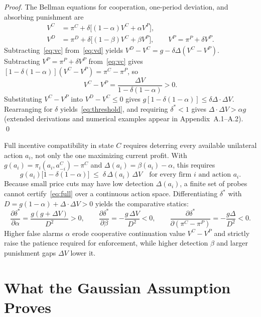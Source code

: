 \documentclass{article}
\begin{document}
\begin{proof}
The Bellman equations for cooperation, one-period deviation, and absorbing punishment are
\begin{align}
V^C &= \pi^C + \delta\bigl[(1-\alpha)V^C + \alpha V^P\bigr],
\label{eq:vc}\\
V^D &= \pi^D + \delta\bigl[(1-\beta)V^C + \beta V^P\bigr], \qquad
V^P = \pi^P + \delta V^P.
\label{eq:vd}
\end{align}
Subtracting~\eqref{eq:vc} from~\eqref{eq:vd} yields $V^D - V^C = g - \delta\Delta(V^C-V^P)$. Subtracting $V^P=\pi^P+\delta V^P$ from~\eqref{eq:vc} gives $[1-\delta(1-\alpha)](V^C-V^P)=\pi^C-\pi^P$, so
\[
V^C - V^P = \frac{\Delta V}{1-\delta(1-\alpha)} > 0.
\]
Substituting $V^C-V^P$ into $V^D-V^C\leq 0$ gives $g[1-\delta(1-\alpha)] \leq \delta\Delta\cdot\Delta V$. Rearranging for $\delta$ yields~\eqref{eq:threshold}, and requiring $\delta^*<1$ gives $\Delta\cdot\Delta V > \alpha g$ (extended derivations and numerical examples appear in Appendix~A.1--A.2). \qed
\end{proof}

Full incentive compatibility in state $C$ requires deterring every available unilateral action $a_i$, not only the one maximizing current profit. With $g(a_i)=\pi_i(a_i,a_{-i}^C)-\pi^C$ and $\Delta(a_i)=\beta(a_i)-\alpha$, this requires
\begin{equation}\label{eq:full}
g(a_i)\bigl[1-\delta(1-\alpha)\bigr] \;\leq\;
\delta\,\Delta(a_i)\,\Delta V
\quad\text{for every firm } i \text{ and action } a_i.
\end{equation}
Because small price cuts may have low detection $\Delta(a_i)$, a finite set of probes cannot certify~\eqref{eq:full} over a continuous action space. Differentiating $\delta^*$ with $D=g(1-\alpha)+\Delta\cdot\Delta V > 0$ yields the comparative statics:
\begin{equation}\label{eq:compstat}
\frac{\partial\delta^*}{\partial\alpha}=\frac{g(g+\Delta V)}{D^2}>0,\qquad
\frac{\partial\delta^*}{\partial\beta}=-\frac{g\,\Delta V}{D^2}<0,\qquad
\frac{\partial\delta^*}{\partial(\pi^C-\pi^P)}=-\frac{g\Delta}{D^2}<0.
\end{equation}
Higher false alarms $\alpha$ erode cooperative continuation value $V^C-V^P$ and strictly raise the patience required for enforcement, while higher detection $\beta$ and larger punishment gaps $\Delta V$ lower it.

\section{What the Gaussian Assumption Proves}
\end{document}
